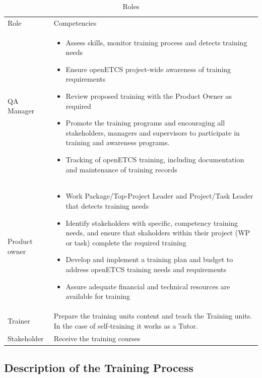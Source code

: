 \documentclass{template/openetcs_article}
\begin{document}
\begin{table}[H]
\begin{tabular}{|m{}|m{10cm}|}
\hline
\rowcolor{myblue}
\multicolumn{2}{|c|}{Roles} \\\hline
\rowcolor{lightgray}
Role &
Competencies \\\hline
QA Manager &
\begin{itemize}
\item Assess skills, monitor training process and detects training needs
\item Ensure openETCS project-wide awareness of training requirements
\item Review proposed training with the Product Owner as required
\item Promote the training programs and encouraging all stakeholders, managers and supervisors to participate in training and awareness programs.
\item Tracking of openETCS training, including documentation and maintenance of training records
\end{itemize}
\\\hline
Product owner &
\begin{itemize}
\item Work Package/Top-Project Leader and Project/Task Leader that detects training needs
\item Identify stakeholders with specific, competency training needs, and ensure that skaholders within their project (WP or task) complete the required training
\item Develop and implement a training plan and budget to address openETCS training needs and requirements
\item Assure adequate financial and technical resources are available for training
\end{itemize}
\\\hline
Trainer &
Prepare the training units content and teach the Training units. In the case of self-training it works as a Tutor. \\\hline
Stakeholder &
Receive the training courses \\\hline
\end{tabular}
\caption{Roles}
\end{table}

\subsection{Description of the Training Process}
\end{document}
